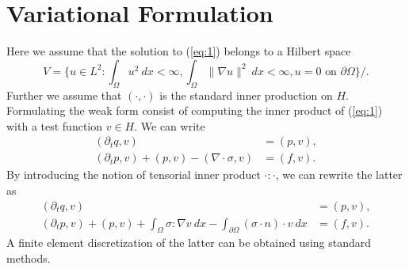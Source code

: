 \documentclass[12pt]{article}
\begin{document}
\section{Variational Formulation}
Here we assume that the solution to (\ref{eq:1}) belongs to a Hilbert space
\begin{equation} \label{eq:2}
	V = \{ u \in L^2 : \int_{\Omega}u^2 \ dx< \infty, \int_{\Omega} \| \nabla u \|^2 \ dx < \infty , u = 0 \text{ on } \partial \Omega \}/.
\end{equation}
Further we assume that $(\cdot,\cdot)$ is the standard inner production on $H$. Formulating the weak form consist of computing the inner product of (\ref{eq:1}) with a test function $v\in H$. We can write
\begin{equation} \label{eq:3}
\begin{aligned}
	(\partial_{t} q, v) &= ( p,v ), \\
	(\partial_{t} p,v) + (p,v) - (\nabla\cdot \sigma,v) &= (f,v).
\end{aligned}
\end{equation}
By introducing the notion of tensorial inner product $\cdot : \cdot$, we can rewrite the latter as
\begin{equation} \label{eq:4}
\begin{aligned}
	(\partial_{t} q, v) &= ( p,v ), \\
	(\partial_{t} p,v) + (p,v) + \int_{\Omega} \sigma:\nabla v \ dx  - \int_{\partial \Omega} (\sigma\cdot n)\cdot v \ dx&= (f,v).
\end{aligned}
\end{equation}
A finite element discretization of the latter can be obtained using standard methods.
\end{document}
